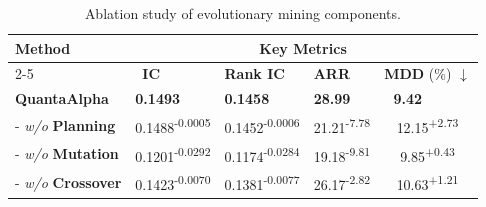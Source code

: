 \begin{table}[h]
  \centering
  \normalsize %
  \caption{Ablation study of evolutionary mining components.}
  \label{tab:ablation_study_two_column}
  \setlength{\tabcolsep}{10pt} %
  \begin{tabular}{lcccc}
    \toprule
   \multirow{2}{*}{Method} & \multicolumn{4}{c}{Key Metrics} \\
    \cmidrule(lr){2-5}
     &  \multicolumn{1}{l}{\,\,\,\textbf{IC}} &  \multicolumn{1}{l}{\textbf{Rank IC}} &  \multicolumn{1}{l}{\textbf{ARR}} (\%) & \textbf{MDD} (\%) $\downarrow$\\
    \midrule

     \textbf{QuantaAlpha}
& \multicolumn{1}{l}{\textbf{0.1493}}
& \multicolumn{1}{l}{\textbf{0.1458}}
& \multicolumn{1}{l}{\textbf{28.99}}
& \multicolumn{1}{l}{\,\,\,\,\textbf{9.42}} \\

     \phantom{Q} -  \emph{w/o} \textbf{Planning}
      & 0.1488\textsuperscript{\textcolor[RGB]{230,180,180}{\tiny -0.0005}}
      & 0.1452\textsuperscript{\textcolor[RGB]{230,180,180}{\tiny -0.0006}}
      & 21.21\textsuperscript{\textcolor[RGB]{180,20,20}{\tiny -7.78}}
      & 12.15\textsuperscript{\textcolor[RGB]{200,50,50}{\tiny +2.73}} \\

     \phantom{Q} -  \emph{w/o} \textbf{Mutation}
      & 0.1201\textsuperscript{\textcolor[RGB]{180,60,60}{\tiny -0.0292}}
      & 0.1174\textsuperscript{\textcolor[RGB]{180,60,60}{\tiny -0.0284}}
      & 19.18\textsuperscript{\textcolor[RGB]{160,20,20}{\tiny -9.81}}
      & 9.85\textsuperscript{\textcolor[RGB]{220,160,160}{\tiny +0.43}} \\

      \phantom{Q} -  \emph{w/o} \textbf{Crossover}
      & 0.1423\textsuperscript{\textcolor[RGB]{220,150,150}{\tiny -0.0070}}
      & 0.1381\textsuperscript{\textcolor[RGB]{220,150,150}{\tiny -0.0077}}
      & 26.17\textsuperscript{\textcolor[RGB]{200,50,50}{\tiny -2.82}}
      & 10.63\textsuperscript{\textcolor[RGB]{220,100,100}{\tiny +1.21}} \\

    \bottomrule
  \end{tabular}
\end{table}